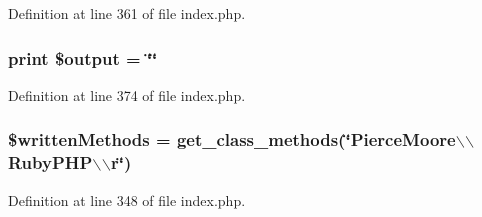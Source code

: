 Definition at line 361 of file index.\-php.

\hypertarget{namespace_pierce_moore_1_1_ruby_p_h_p_a3b3e916294d02621688f0b1b64f95628}{
\subsubsection[{\$output}]{\setlength{\rightskip}{0pt plus 5cm}print \$output = \char`\"{}\char`\"{}}}\label{namespace_pierce_moore_1_1_ruby_p_h_p_a3b3e916294d02621688f0b1b64f95628}


Definition at line 374 of file index.\-php.

\hypertarget{namespace_pierce_moore_1_1_ruby_p_h_p_a2e64f0494f7eccf90168af7f67198650}{
\subsubsection[{\$written\-Methods}]{\setlength{\rightskip}{0pt plus 5cm}\$written\-Methods = get\-\_\-class\-\_\-methods(\char`\"{}Pierce\-Moore$\backslash$$\backslash$\-Ruby\-P\-H\-P$\backslash$$\backslash$r\char`\"{})}}\label{namespace_pierce_moore_1_1_ruby_p_h_p_a2e64f0494f7eccf90168af7f67198650}


Definition at line 348 of file index.\-php.


